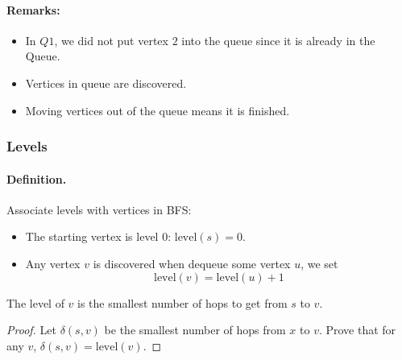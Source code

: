 \documentclass[en,hazy,blue,screen,14pt]{elegantnote}
\newenvironment{claim}[1]{\par\noindent\underline{Claim:}\space#1}{}
\begin{document}
\paragraph{Remarks:}
\begin{itemize}
 \item In $Q1$, we did not put vertex $2$ into the queue since it is already in 
the Queue.
\item Vertices in queue are discovered.
\item Moving vertices out of the queue means it is finished.
\end{itemize}
\subsubsection{Levels}
\paragraph{Definition.}
Associate levels with vertices in BFS: 
\begin{itemize}
 \item The starting vertex is level 0: $\text{level}(s) = 0$.
 \item Any vertex $v$ is discovered when dequeue some vertex $u$, we set
\[\text{level}(v) = \text{level}(u) + 1\]
\end{itemize}

\begin{theorem}
 The level of $v$ is the smallest number of hops to get from $s$ to $v$.
\end{theorem}

\begin{proof}
 Let $\delta(s, v)$ be the smallest number of hops from $x$ to $v$. Prove that for any $v$, $\delta(s, v) = \text{level}(v)$.
\end{proof}

\end{document}
